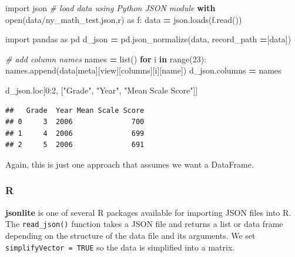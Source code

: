 \documentclass[
]{book}
\newenvironment{Shaded}{\begin{snugshade}}{\end{snugshade}}
\newcommand{\BuiltInTok}[1]{#1}
\newcommand{\CommentTok}[1]{\textcolor[rgb]{0.56,0.35,0.01}{\textit{#1}}}
\newcommand{\ControlFlowTok}[1]{\textcolor[rgb]{0.13,0.29,0.53}{\textbf{#1}}}
\newcommand{\DecValTok}[1]{\textcolor[rgb]{0.00,0.00,0.81}{#1}}
\newcommand{\ImportTok}[1]{#1}
\newcommand{\KeywordTok}[1]{\textcolor[rgb]{0.13,0.29,0.53}{\textbf{#1}}}
\newcommand{\NormalTok}[1]{#1}
\newcommand{\OperatorTok}[1]{\textcolor[rgb]{0.81,0.36,0.00}{\textbf{#1}}}
\newcommand{\StringTok}[1]{\textcolor[rgb]{0.31,0.60,0.02}{#1}}
\begin{document}
\begin{Shaded}
\begin{Highlighting}[]
\ImportTok{import}\NormalTok{ json}
\CommentTok{\# load data using Python JSON module}
\ControlFlowTok{with} \BuiltInTok{open}\NormalTok{(}\StringTok{\textquotesingle{}data/ny\_math\_test.json\textquotesingle{}}\NormalTok{,}\StringTok{\textquotesingle{}r\textquotesingle{}}\NormalTok{) }\ImportTok{as}\NormalTok{ f:}
\NormalTok{    data }\OperatorTok{=}\NormalTok{ json.loads(f.read())}

\ImportTok{import}\NormalTok{ pandas }\ImportTok{as}\NormalTok{ pd  }
\NormalTok{d\_json }\OperatorTok{=}\NormalTok{ pd.json\_normalize(data, record\_path }\OperatorTok{=}\NormalTok{[}\StringTok{\textquotesingle{}data\textquotesingle{}}\NormalTok{])}

\CommentTok{\# add column names}
\NormalTok{names }\OperatorTok{=} \BuiltInTok{list}\NormalTok{()}
\ControlFlowTok{for}\NormalTok{ i }\KeywordTok{in} \BuiltInTok{range}\NormalTok{(}\DecValTok{23}\NormalTok{): }
\NormalTok{  names.append(data[}\StringTok{\textquotesingle{}meta\textquotesingle{}}\NormalTok{][}\StringTok{\textquotesingle{}view\textquotesingle{}}\NormalTok{][}\StringTok{\textquotesingle{}columns\textquotesingle{}}\NormalTok{][i][}\StringTok{\textquotesingle{}name\textquotesingle{}}\NormalTok{])}
\NormalTok{d\_json.columns }\OperatorTok{=}\NormalTok{ names}

\NormalTok{d\_json.loc[}\DecValTok{0}\NormalTok{:}\DecValTok{2}\NormalTok{, [}\StringTok{"Grade"}\NormalTok{, }\StringTok{"Year"}\NormalTok{, }\StringTok{"Mean Scale Score"}\NormalTok{]]  }
\end{Highlighting}
\end{Shaded}

\begin{verbatim}
##   Grade  Year Mean Scale Score
## 0     3  2006              700
## 1     4  2006              699
## 2     5  2006              691
\end{verbatim}

Again, this is just one approach that assumes we want a DataFrame.

\hypertarget{r-14}{%
\subsubsection*{R}\label{r-14}}

\textbf{jsonlite} is one of several R packages available for importing JSON files into R. The \texttt{read\_json()} function takes a JSON file and returns a list or data frame depending on the structure of the data file and its arguments. We set \texttt{simplifyVector\ =\ TRUE} so the data is simplified into a matrix.
\end{document}
